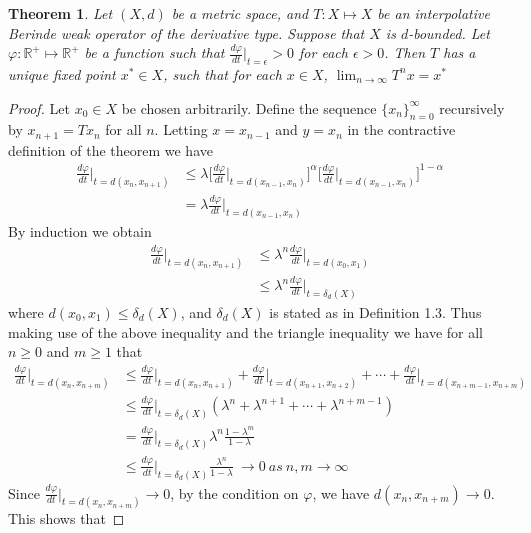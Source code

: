 \documentclass[11pt,letterpaper]{article}
\newtheorem{thm}{Theorem}[section]
\begin{document}
\begin{thm} Let $(X,d)$ be a metric space, and $T:X\mapsto X$ be an interpolative Berinde weak operator of the derivative type. Suppose that $X$ is $d$-bounded. Let $\varphi: \mathbb{R}^{+}\mapsto \mathbb{R}^{+}$ be a function such that $\frac{d\varphi}{dt}\bigg|_{t=\epsilon} >0$ for each $\epsilon>0$. Then $T$ has a unique fixed point $x^{*}\in X$, such that for each $x\in X$, $\lim_{n\to\infty} T^{n}x=x^{*}$
\end{thm}

\begin{proof} Let $x_0\in X$ be chosen arbitrarily. Define the sequence $\{x_n\}_{n=0}^{\infty}$ recursively by $x_{n+1}=Tx_n$ for all $n$. Letting $x=x_{n-1}$ and $y=x_n$ in the contractive definition of the theorem we have
\begin{align*}
\frac{d\varphi}{dt}\bigg|_{t=d(x_n,x_{n+1})} & \leq \lambda \bigg[\frac{d\varphi}{dt}\bigg|_{t=d(x_{n-1},x_n)}\bigg]^{\alpha} \bigg[\frac{d\varphi}{dt}\bigg|_{t=d(x_{n-1},x_n)}\bigg]^{1-\alpha} \\
&= \lambda \frac{d\varphi}{dt}\bigg|_{t=d(x_{n-1},x_n)}
\end{align*}
By induction we obtain
\begin{align*}
\frac{d\varphi}{dt}\bigg|_{t=d(x_n,x_{n+1})} & \leq \lambda^{n} \frac{d\varphi}{dt}\bigg|_{t=d(x_0,x_1)} \\
& \leq \lambda^{n} \frac{d\varphi}{dt}\bigg|_{t=\delta_d(X)}
\end{align*}
where $d(x_0,x_1)\leq \delta_d(X)$, and $\delta_d(X)$ is stated as in Definition 1.3. Thus making use of the above inequality and the triangle inequality we have for all $n\geq 0$ and $m\geq 1$ that 
\begin{align*}
\frac{d\varphi}{dt}\bigg|_{t=d(x_n,x_{n+m})}&\leq \frac{d\varphi}{dt}\bigg|_{t=d(x_n,x_{n+1})}+\frac{d\varphi}{dt}\bigg|_{t=d(x_{n+1},x_{n+2})}+\cdots+ \frac{d\varphi}{dt}\bigg|_{t=d(x_{n+m-1},x_{n+m})} \\
&\leq \frac{d\varphi}{dt}\bigg|_{t=\delta_d(X)} (\lambda^{n}+\lambda^{n+1}+\cdots+\lambda^{n+m-1})\\
&=\frac{d\varphi}{dt}\bigg|_{t=\delta_d(X)} \lambda ^{n} \frac{1-\lambda^{m}}{1-\lambda}\\
&\leq \frac{d\varphi}{dt}\bigg|_{t=\delta_d(X)} \frac{\lambda^{n}}{1-\lambda}~\rightarrow 0~as~n,m \rightarrow \infty
\end{align*}
Since $\frac{d\varphi}{dt}\bigg|_{t=d(x_n,x_{n+m})} \rightarrow 0$, by the condition on $\varphi$, we have $d(x_n,x_{n+m})\rightarrow 0$. This shows that

\end{proof}
\end{document}
